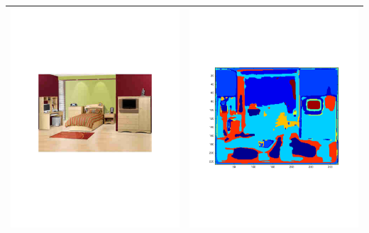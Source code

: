 \documentclass[12pt]{article}
\begin{document}
\begin{longtable}{| c | c |}
  \includegraphics[trim=40mm 40mm 40mm 40mm,clip=true,width=0.45\linewidth]{images/bedroom_1.pdf} & \includegraphics[trim=25mm 25mm 25mm 25mm,clip=true,width=0.45\linewidth]{images/bedroom_2.pdf} \\
  \hline

\end{longtable}
\end{document}

